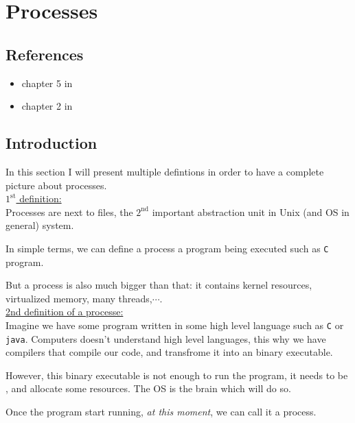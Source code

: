 \documentclass[12pt,a4paper]{book}
\begin{document}
\chapter{Processes}

\section{References}

\begin{itemize}

\item chapter 5 in \cite{book_Linux_System_Programming_Robert_Love}

\item chapter 2 in \cite{book_modern_operating_system}

\end{itemize}

\section{Introduction}

In this section I will present multiple defintions in order to have a complete picture about processes.\\


\underline{$\mathrm{1}^\mathrm{st}$ definition:}\\

Processes are next to files, the $\mathrm{2}^\mathrm{nd}$ important abstraction unit in Unix (and OS in general) system.

In simple terms, we can define a process a program being executed such as \verb|C| program.

But a process is also much bigger than that: it contains kernel resources, virtualized memory, many threads,$\cdots$.\\

\underline{2nd definition of a processe:}\\

Imagine we have some program written in some high level language such as \verb|C| or \verb|java|. Computers doesn't understand high level languages, this why we have compilers that compile our code, and transfrome it into an binary executable.

However, this binary executable is not enough to run the program, it needs to be , and allocate some resources. The OS is the brain which will do so.

Once the program start running, \textit{at this moment}, we can call it a process.\\
\end{document}

